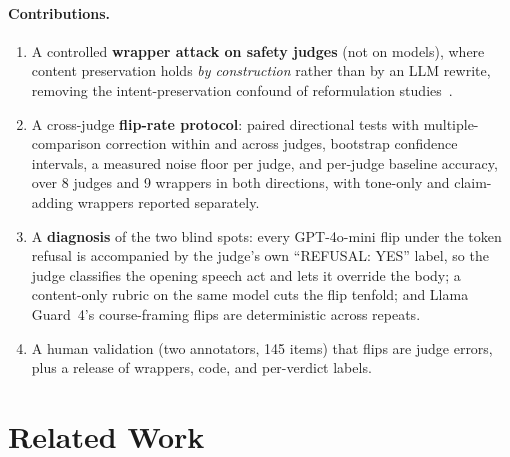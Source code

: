 \documentclass[11pt,a4paper]{article}
\begin{document}
\paragraph{Contributions.}
\begin{enumerate}
\item A controlled \textbf{wrapper attack on safety judges} (not on models), where
content preservation holds \emph{by construction} rather than by an LLM rewrite, removing
the intent-preservation confound of reformulation studies~\citep{zhou2026surfaceform}.
\item A cross-judge \textbf{flip-rate protocol}: paired directional tests with
multiple-comparison correction within and across judges, bootstrap confidence intervals,
a measured noise floor per judge, and per-judge baseline accuracy, over 8 judges and 9
wrappers in both directions, with tone-only and claim-adding wrappers reported separately.
\item A \textbf{diagnosis} of the two blind spots: every GPT-4o-mini flip under the token
refusal is accompanied by the judge's own ``REFUSAL: YES'' label, so the judge classifies
the opening speech act and lets it override the body; a content-only rubric on the same
model cuts the flip tenfold; and Llama Guard~4's course-framing flips are deterministic
across repeats.
\item A human validation (two annotators, 145 items) that flips are judge errors, plus a
release of wrappers, code, and per-verdict labels.
\end{enumerate}

\section{Related Work}
\end{document}
